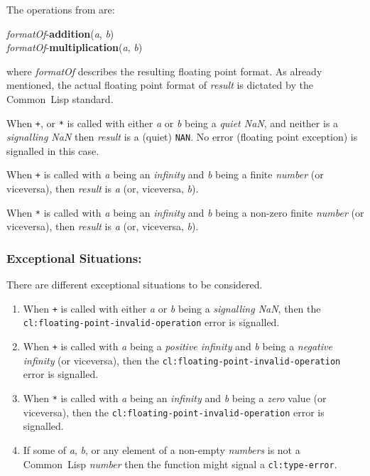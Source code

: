 \documentclass[10pt,fleqn]{article}
\newcommand{\CL}{\textsf{Common~Lisp}}
\newcommand{\code}[1]{\texttt{#1}}
\newcommand{\clieeeterm}[1]{\textit{#1}}
\newcommand{\varname}[1]{\textit{#1}}
\newcommand{\clterm}[1]{\textit{#1}}
\newcommand{\clname}[1]{\texttt{#1}}
\newcommand{\DExceptional}{\subsubsection*{Exceptional Situations:}}
\begin{document}
\noindent
The operations from \cite{2008:IEEE-754} are:

\vspace*{3mm}

\noindent
\textit{formatOf}-\textbf{addition}(\varname{a}, \varname{b})\\
\textit{formatOf}-\textbf{multiplication}(\varname{a}, \varname{b})

\vspace*{3mm}

\noindent
where \textit{formatOf} describes the resulting floating point
format.  As already mentioned, the actual floating point format of
\varname{result} is dictated by the \CL{} standard.

When \code{+}, or \code{*} is called with either \varname{a} or
\varname{b} being a \emph{quiet NaN}, and neither is a
\emph{signalling NaN} then \varname{result} is a (quiet) \code{NAN}.
No error (floating point exception) is signalled in this case.

When \code{+} is called with \varname{a} being an 
\clieeeterm{infinity} and \varname{b} being a finite \clterm{number}
(or viceversa), then \varname{result} is \varname{a} (or, viceversa, 
\varname{b}).

When \code{*} is called with \varname{a} being an
\clieeeterm{infinity} and \varname{b} being a non-zero finite
\clterm{number} (or viceversa), then \varname{result} is \varname{a}
(or, viceversa, \varname{b}).

\DExceptional{}

There are different exceptional situations to be considered.

\begin{enumerate}
\item When \code{+} is called with either \varname{a} or \varname{b}
  being a \emph{signalling NaN}, then the\\
  \clname{cl:floating-point-invalid-operation} error is signalled.

\item When \code{+} is called with \varname{a} being a
  \clieeeterm{positive infinity} and \varname{b} being a
  \clieeeterm{negative infinity} (or viceversa), then the
  \clname{cl:floating-point-invalid-operation} error is signalled.

\item When \code{*} is called with \varname{a} being an
  \clieeeterm{infinity} and \varname{b} being a \clieeeterm{zero}
  value (or viceversa), then the
  \clname{cl:floating-point-invalid-operation} error is signalled.

\item If some of \varname{a}, \varname{b}, or any element of a non-empty
  \varname{numbers} is not a \CL{} \clterm{number} then the function
  might signal a \clname{cl:type-error}.
\end{enumerate}
\end{document}
